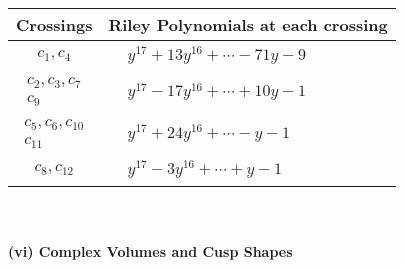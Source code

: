 \documentclass[1p]{elsarticle_modified}
\theoremstyle{definition}
\begin{document}
\begin{tabular}{m{50pt}|m{274pt}}
Crossings & \hspace{64pt}Riley Polynomials at each crossing \\
\hline $$\begin{aligned}c_{1},c_{4}\end{aligned}$$&$\begin{aligned}
&y^{17}+13 y^{16}+\cdots-71 y-9
\end{aligned}$\\
\hline $$\begin{aligned}c_{2},c_{3},c_{7}\\c_{9}\end{aligned}$$&$\begin{aligned}
&y^{17}-17 y^{16}+\cdots+10 y-1
\end{aligned}$\\
\hline $$\begin{aligned}c_{5},c_{6},c_{10}\\c_{11}\end{aligned}$$&$\begin{aligned}
&y^{17}+24 y^{16}+\cdots- y-1
\end{aligned}$\\
\hline $$\begin{aligned}c_{8},c_{12}\end{aligned}$$&$\begin{aligned}
&y^{17}-3 y^{16}+\cdots+y-1
\end{aligned}$\\
\hline
\end{tabular}\\~\\
\newpage\flushleft \textbf{(vi) Complex Volumes and Cusp Shapes}
\end{document}
